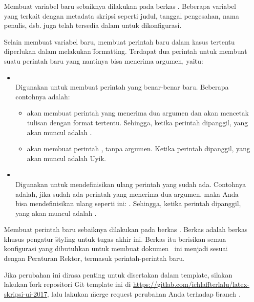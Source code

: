 Membuat variabel baru sebaiknya dilakukan pada berkas . Beberapa variabel yang terkait dengan metadata skripsi seperti judul, tanggal pengesahan, nama penulis, dsb. juga telah tersedia dalam  untuk dikonfigurasi.

Selain membuat variabel baru, membuat perintah baru dalam kasus tertentu diperlukan dalam melakukan \f{formatting}. Terdapat dua perintah untuk membuat suatu perintah baru yang nantinya bisa menerima argumen, yaitu:
\begin{itemize}
	\item {} \\
	Digunakan untuk membuat perintah yang benar-benar baru. Beberapa contohnya adalah:
	\begin{itemize}
		\item {} akan membuat perintah  yang menerima dua argumen dan akan mencetak tulisan dengan format tertentu. Sehingga, ketika perintah  dipanggil, yang akan muncul adalah .
		\item {} akan membuat perintah , tanpa argumen. Ketika perintah  dipanggil, yang akan muncul adalah Uyik.
	\end{itemize}
	\item {} \\
	Digunakan untuk mendefinisikan ulang perintah yang sudah ada. Contohnya adalah, jika sudah ada perintah  yang menerima dua argumen, maka Anda bisa mendefinisikan ulang seperti ini: . Sehingga, ketika perintah  dipanggil, yang akan muncul adalah .
\end{itemize}

Membuat perintah baru sebaiknya dilakukan pada berkas .
Berkas  adalah berkas khusus pengatur \f{styling} untuk tugas akhir ini.
Berkas itu berisikan semua konfigurasi yang dibutuhkan untuk membuat dokumen \latex~ini menjadi sesuai dengan Peraturan Rektor, termasuk perintah-perintah baru.

Jika perubahan ini dirasa penting untuk disertakan dalam template, silakan lakukan \f{fork} repositori Git template ini di \url{https://gitlab.com/ichlaffterlalu/latex-skripsi-ui-2017}, lalu lakukan \f{merge request} perubahan Anda terhadap \f{branch} .


